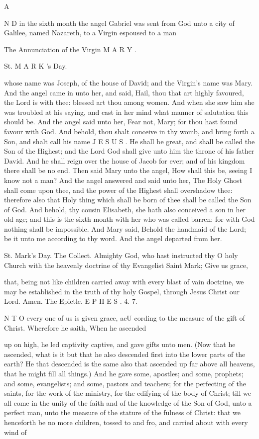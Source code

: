 A

N D in the sixth month the angel Gabriel was sent from God unto a city of Galilee, named Nazareth, to a Virgin espoused to a man

The Annunciation of the Virgin M A R Y .

St. M A R K ’s Day.

whose name was Joseph, of the house of David; and the Virgin’s name was Mary. And the angel came in unto her, and said, Hail, thou that art highly favoured, the Lord is with thee: blessed art thou among women. And when she saw him she was troubled at his saying, and cast in her mind what manner of salutation this should be. And the angel said unto her, Fear not, Mary; for thou hast found favour with God. And behold, thou shalt conceive in thy womb, and bring forth a Son, and shalt call his name J E S U S . He shall be great, and shall be called the Son of the Highest; and the Lord God shall give unto him the throne of his father David. And he shall reign over the house of Jacob for ever; and of his kingdom there shall be no end. Then said Mary unto the angel, How shall this be, seeing I know not a man? And the angel answered and said unto her, The Holy Ghost shall come upon thee, and the power of the Highest shall overshadow thee: therefore also that Holy thing which shall be born of thee shall be called the Son of God. And behold, thy cousin Elisabeth, she hath also conceived a son in her old age; and this is the sixth month with her who was called barren: for with God nothing shall be impossible. And Mary said, Behold the handmaid of the Lord; be it unto me according to thy word. And the angel departed from her.

St. Mark’s Day. The Collect. Almighty God, who hast instructed thy O holy Church with the heavenly doctrine of thy Evangelist Saint Mark; Give us grace,

that, being not like children carried away with every blast of vain doctrine, we may be established in the truth of thy holy Gospel, through Jesus Christ our Lord. Amen. The Epictle. E P H E S . 4. 7.

N T O every one of us is given grace, acU cording to the measure of the gift of Christ. Wherefore he saith, When he ascended

up on high, he led captivity captive, and gave gifts unto men. (Now that he ascended, what is it but that he also descended first into the lower parts of the earth? He that descended is the same also that ascended up far above all heavens, that he might fill all things.) And he gave some, apostles; and some, prophets; and some, evangelists; and some, pastors and teachers; for the perfecting of the saints, for the work of the ministry, for the edifying of the body of Christ; till we all come in the unity of the faith and of the knowledge of the Son of God, unto a perfect man, unto the measure of the stature of the fulness of Christ: that we henceforth be no more children, tossed to and fro, and carried about with every wind of

